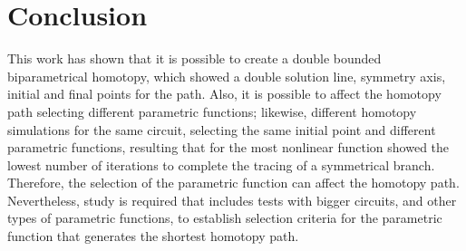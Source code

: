 \documentclass[conference,letterpaper,twocolumn]{IEEEtran}
\begin{document}
\begin{table}[hbtp]
{\small
{}
}
\caption{Three Operating points (solutions) found at $\lambda_1=1$ and $\lambda_2=1$}
\label{yamamuracircuitosoluc1}
\end{table}


\section{Conclusion}

This work has shown that it is possible to create a double bounded biparametrical homotopy, which showed a double solution line, symmetry axis, initial and final points for the path. Also, it is possible to affect the homotopy path selecting different parametric functions; likewise, different homotopy simulations for the same circuit, selecting the same initial point and different parametric functions, resulting that for the most nonlinear function showed the lowest number of iterations to complete the tracing of a symmetrical branch. Therefore, the selection of the parametric function can affect the homotopy path. Nevertheless, study is required that includes tests with bigger circuits, and other types of parametric functions, to establish selection criteria for the parametric function that generates the shortest homotopy path.



\end{document}
